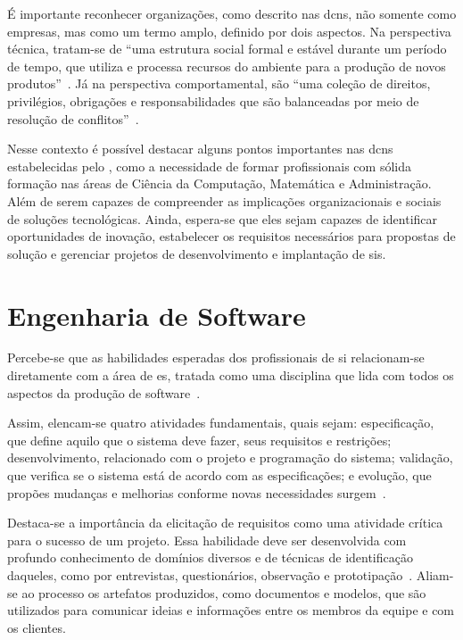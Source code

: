 \documentclass[12pt]{article}
\begin{document}
É importante reconhecer organizações, como descrito nas \glspl{dcn}, não somente como empresas, mas como um termo amplo, definido por dois aspectos.
Na perspectiva técnica, tratam-se de ``uma estrutura social formal e estável durante um período de tempo, que utiliza e processa recursos do ambiente para a produção de novos produtos''~\cite{zorzo2017referenciais}.
Já na perspectiva comportamental, são ``uma coleção de direitos, privilégios, obrigações e responsabilidades que são balanceadas por meio de resolução de conflitos''~\cite{zorzo2017referenciais}.

Nesse contexto é possível destacar alguns pontos importantes nas \glspl{dcn} estabelecidas pelo \textcite{mec2016dcn}, como a necessidade de formar profissionais com sólida formação nas áreas de Ciência da Computação, Matemática e Administração.
Além de serem capazes de compreender as implicações organizacionais e sociais de soluções tecnológicas.
Ainda, espera-se que eles sejam capazes de identificar oportunidades de inovação, estabelecer os requisitos necessários para propostas de solução e gerenciar projetos de desenvolvimento e implantação de \glspl{si}.

\section{Engenharia de Software}%
\label{sec:engenharia_de_software}

Percebe-se que as habilidades esperadas dos profissionais de \gls{si} relacionam-se diretamente com a área de \gls{es}, tratada como uma disciplina que lida com todos os aspectos da produção de software~\cite{sommerville2011software}.

Assim, elencam-se quatro atividades fundamentais, quais sejam: especificação, que define aquilo que o sistema deve fazer, seus requisitos e restrições; desenvolvimento, relacionado com o projeto e programação do sistema; validação, que verifica se o sistema está de acordo com as especificações; e evolução, que propões mudanças e melhorias conforme novas necessidades surgem~\cite{sommerville2011software}.

Destaca-se a importância da elicitação de requisitos como uma atividade crítica para o sucesso de um projeto.
Essa habilidade deve ser desenvolvida com profundo conhecimento de domínios diversos e de técnicas de identificação daqueles, como por entrevistas, questionários, observação e prototipação~\cite{sommerville2011software}.
Aliam-se ao processo os artefatos produzidos, como documentos e modelos, que são utilizados para comunicar ideias e informações entre os membros da equipe e com os clientes.
\end{document}
